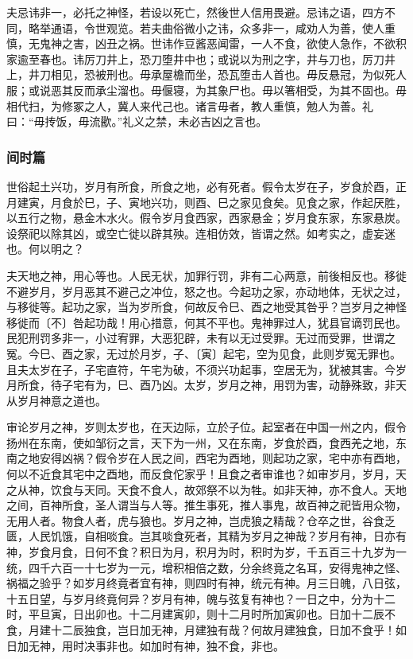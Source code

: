 \documentclass[]{article}
\begin{document}
夫忌讳非一，必托之神怪，若设以死亡，然後世人信用畏避。忌讳之语，四方不同，略举通语，令世观览。若夫曲俗微小之讳，众多非一，咸劝人为善，使人重慎，无鬼神之害，凶丑之祸。世讳作豆酱恶闻雷，一人不食，欲使人急作，不欲积家逾至春也。讳厉刀井上，恐刀堕井中也；或说以为刑之字，井与刀也，厉刀井上，井刀相见，恐被刑也。毋承屋檐而坐，恐瓦堕击人首也。毋反悬冠，为似死人服；或说恶其反而承尘溜也。毋偃寝，为其象尸也。毋以箸相受，为其不固也。毋相代扫，为修冢之人，冀人来代己也。诸言毋者，教人重慎，勉人为善。礼曰：``毋抟饭，毋流歠。''礼义之禁，未必吉凶之言也。

\hypertarget{header-n832}{%
\subsubsection{间时篇}\label{header-n832}}

世俗起土兴功，岁月有所食，所食之地，必有死者。假令太岁在子，岁食於酉，正月建寅，月食於巳，子、寅地兴功，则酉、巳之家见食矣。见食之家，作起厌胜，以五行之物，悬金木水火。假令岁月食西家，西家悬金；岁月食东家，东家悬炭。设祭祀以除其凶，或空亡徙以辟其殃。连相仿效，皆谓之然。如考实之，虚妄迷也。何以明之？

夫天地之神，用心等也。人民无状，加罪行罚，非有二心两意，前後相反也。移徙不避岁月，岁月恶其不避己之冲位，怒之也。今起功之家，亦动地体，无状之过，与移徙等。起功之家，当为岁所食，何故反令巳、酉之地受其咎乎？岂岁月之神怪移徙而〔不〕咎起功哉！用心措意，何其不平也。鬼神罪过人，犹县官谪罚民也。民犯刑罚多非一，小过宥罪，大恶犯辟，未有以无过受罪。无过而受罪，世谓之冤。今巳、酉之家，无过於月岁，子、〔寅〕起宅，空为见食，此则岁冤无罪也。且夫太岁在子，子宅直符，午宅为破，不须兴功起事，空居无为，犹被其害。今岁月所食，待子宅有为，巳、酉乃凶。太岁，岁月之神，用罚为害，动静殊致，非天从岁月神意之道也。

审论岁月之神，岁则太岁也，在天边际，立於子位。起室者在中国一州之内，假令扬州在东南，使如邹衍之言，天下为一州，又在东南，岁食於酉，食西羌之地，东南之地安得凶祸？假令岁在人民之间，西宅为酉地，则起功之家，宅中亦有酉地，何以不近食其宅中之酉地，而反食佗家乎！且食之者审谁也？如审岁月，岁月，天之从神，饮食与天同。天食不食人，故郊祭不以为牲。如非天神，亦不食人。天地之间，百神所食，圣人谓当与人等。推生事死，推人事鬼，故百神之祀皆用众物，无用人者。物食人者，虎与狼也。岁月之神，岂虎狼之精哉？仓卒之世，谷食乏匮，人民饥饿，自相啖食。岂其啖食死者，其精为岁月之神哉？岁月有神，日亦有神，岁食月食，日何不食？积日为月，积月为时，积时为岁，千五百三十九岁为一统，四千六百一十七岁为一元，增积相倍之数，分余终竟之名耳，安得鬼神之怪、祸福之验乎？如岁月终竟者宜有神，则四时有神，统元有神。月三日魄，八日弦，十五日望，与岁月终竟何异？岁月有神，魄与弦复有神也？一日之中，分为十二时，平旦寅，日出卯也。十二月建寅卯，则十二月时所加寅卯也。日加十二辰不食，月建十二辰独食，岂日加无神，月建独有哉？何故月建独食，日加不食乎！如日加无神，用时决事非也。如加时有神，独不食，非也。
\end{document}
